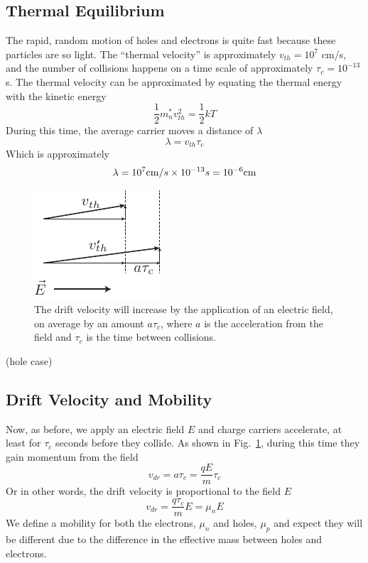 \subsection{Thermal Equilibrium}
The rapid, random motion of holes and electrons is quite fast because these particles are so light.  The “thermal velocity” is approximately $v_{th} = 10^7$ cm/s, and the number of collisions happens on a time scale of approximately $\tau_c = 10^{-13}$s.  The thermal velocity can be approximated by equating the thermal energy with the kinetic energy
\begin{equation}
    {\frac{1}{2}}m_n^*v_{th}^2 = {\frac{1}{2}}kT
\end{equation}
During this time, the average carrier moves a distance of $\lambda$
\begin{equation} \lambda  = {v_{th}}{\tau _c}\end{equation}
Which is approximately
\begin{equation}
        \lambda  = {10^7}{\rm{cm}}/s \times {10^{ - 13}}s = {10^{ - 6}}{\rm{cm}}
\end{equation}
\begin{figure}[tb]
\centering
\includegraphics[width=.3\columnwidth]{drift_field}
\caption{The drift velocity will increase by the application of an electric field, on average by an amount $a \tau_c$, where $a$ is the acceleration from the field and $\tau_c$ is the time between collisions.}
\label{fig:drift_field}
\end{figure}
(hole case)
\subsection{Drift Velocity and Mobility}
Now, as before, we apply an electric field $E$ and charge carriers accelerate, at least for  $\tau_c$ seconds before they collide.
As shown in Fig.~\ref{fig:drift_field}, during this time they gain momentum from the field
\begin{equation}
        v_{dr} = a \tau_c = \frac{q E}{m} \tau_c
\end{equation}
Or in other words, the drift velocity is proportional to the field $E$
\begin{equation}
        v_{dr} = \frac{q \tau_c}{m} E = \mu_n E
\end{equation}
We define a mobility for both the electrons, $\mu_n$ and holes, $\mu_p$ and expect they will be different due to the difference in the effective mass between holes and electrons.
